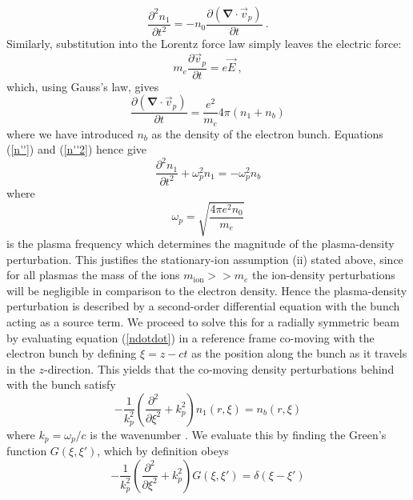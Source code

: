 \begin{equation}
\frac{\partial^2 n_1}{\partial t^2}= -n_0\frac{\partial (\mathbf{\nabla}\cdot\vec{v}_p)}{\partial t}~.
\label{n''}
\end{equation}
Similarly, substitution into the Lorentz force law simply leaves the electric force:
\begin{equation}
 m_e\frac{\partial \vec{v}_p}{\partial t}= e\vec{E}~,
 \label{lorentz_force_plasma}
\end{equation} %
which, using Gauss's law, gives
\begin{equation}
\frac{\partial (\mathbf{\nabla}\cdot\vec{v}_p)}{\partial t}= \frac{e^2}{m_e}4\pi (n_1+n_b)
\label{n''2}
\end{equation}
where we have introduced $n_b$ as the density of the electron bunch. Equations (\ref{n''}) and (\ref{n''2}) hence give
\begin{equation}
\frac{\partial^2 n_1}{\partial t^2}+\omega_p^2n_1=-\omega_p^2n_b
\label{ndotdot}
\end{equation}
where 
\begin{equation}
\omega_p=\sqrt{\frac{4\pi e^2n_0}{m_e} }
\label{plasma_frequency}
\end{equation}
is the plasma frequency which determines the magnitude of the plasma-density perturbation. This justifies the stationary-ion assumption (ii) stated above, since for all plasmas the mass of the ions $m_{\text{ion}}>>m_{e}$ the ion-density perturbations will be negligible in comparison to the electron density. Hence the plasma-density perturbation is described by a second-order differential equation with the bunch acting as a source term. We proceed to solve this for a radially symmetric beam by evaluating equation (\ref{ndotdot}) in a reference frame co-moving with the electron bunch \cite{Dawson1959} by defining $\xi=z-ct$ as the position along the bunch as it travels in the $z$-direction. This yields that the co-moving density perturbations  behind with the bunch satisfy
\begin{equation}
-\frac{1}{k_p^2}\left(\frac{\partial^2 }{\partial \xi^2}+k_p^2\right)n_1\left(r,\xi \right)=n_b\left(r,\xi \right) 
\end{equation}  %
where $k_p=\omega_p/c$ is the wavenumber . We evaluate this by finding the Green's function $G\left(\xi,\xi'\right)$, which by definition obeys 
\begin{equation}
-\frac{1}{k_p^2}\left(\frac{\partial^2 }{\partial \xi^2}+k_p^2\right)G\left(\xi,\xi'\right)=\delta\left(\xi-\xi'\right)
\label{density_greens}
\end{equation}
